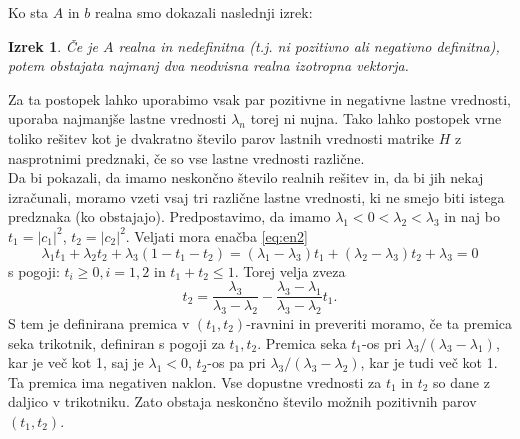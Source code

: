 \documentclass[12pt,a4paper]{amsart}
\theoremstyle{definition}
\theoremstyle{plain}
\newtheorem{izrek}[definicija]{Izrek}
\newcommand{\abs}[1]{ \left\lvert#1\right\rvert}
\begin{document}
Ko sta $A$ in $b$ realna smo dokazali naslednji izrek:
\begin{izrek}\cite{meurant}
Če je $A$ realna in nedefinitna (t.j. ni pozitivno ali negativno definitna), potem obstajata najmanj dva neodvisna realna izotropna vektorja. 
\end{izrek}
Za ta postopek lahko uporabimo vsak par pozitivne in negativne lastne vrednosti, uporaba najmanjše lastne vrednosti $\lambda_n$ torej ni nujna. Tako lahko postopek vrne toliko rešitev kot je dvakratno število parov lastnih vrednosti matrike $H$ z nasprotnimi predznaki, če so vse lastne vrednosti različne.\\
Da bi pokazali, da imamo neskončno število realnih rešitev in, da bi jih nekaj izračunali, moramo vzeti vsaj tri različne lastne vrednosti, ki ne smejo biti istega predznaka (ko obstajajo). Predpostavimo, da imamo $\lambda_1 <0<\lambda_2<\lambda_3$ in naj bo $t_1=\abs{c_1}^2$, $t_2=\abs{c_2}^2$. Veljati mora enačba \eqref{eq:en2}
\begin{equation}\label{trije}
\lambda_1 t_1 +\lambda_2 t_2 +\lambda_3 (1- t_1 -t_2)=(\lambda_1 -\lambda_3)t_1 +(\lambda_2 -\lambda_3)t_2 +\lambda_3=0
\end{equation}
s pogoji: $t_i \ge 0, i=1,2$ in $t_1 +t_2\le1$. Torej velja zveza $$t_2=\frac{\lambda_3}{\lambda_3 - \lambda_2} -\frac{\lambda_3 -\lambda_1}{\lambda_3 -\lambda_2}t_1.$$
S tem je definirana premica v $(t_1,t_2)\text{-ravnini}$ in preveriti moramo, če ta premica seka trikotnik, definiran s pogoji za $t_1,t_2$. Premica seka $t_1$-os pri $\lambda_3 /(\lambda_3 -\lambda_1)$, kar je več kot 1, saj je $\lambda_1 <0$, $t_2$-os pa pri $\lambda_3 /(\lambda_3 - \lambda_2)$, kar je tudi več kot 1. Ta premica ima negativen naklon. Vse dopustne vrednosti za $t_1$ in $t_2$ so dane z daljico v trikotniku. Zato obstaja neskončno število možnih pozitivnih parov $(t_1,t_2)$.
\end{document}
